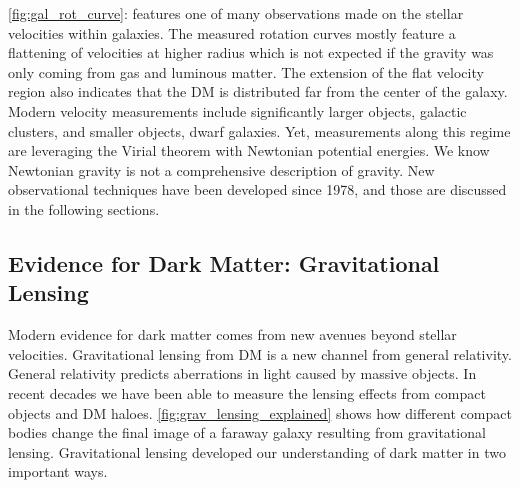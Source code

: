 \cref{fig:gal_rot_curve}: features one of many observations made on the stellar velocities within galaxies.
The measured rotation curves mostly feature a flattening of velocities at higher radius which is not expected if the gravity was only coming from gas and luminous matter.
The extension of the flat velocity region also indicates that the DM is distributed far from the center of the galaxy.
Modern velocity measurements include significantly larger objects, galactic clusters, and smaller objects, dwarf galaxies.
Yet, measurements along this regime are leveraging the Virial theorem with Newtonian potential energies.
We know Newtonian gravity is not a comprehensive description of gravity.
New observational techniques have been developed since 1978, and those are discussed in the following sections.

\subsection{Evidence for Dark Matter: Gravitational Lensing\label{sec:ev4dm_lens}}

Modern evidence for dark matter comes from new avenues beyond stellar velocities.
Gravitational lensing from DM is a new channel from general relativity.
General relativity predicts aberrations in light caused by massive objects.
In recent decades we have been able to measure the lensing effects from compact objects and DM haloes.
\cref{fig:grav_lensing_explained} shows how different compact bodies change the final image of a faraway galaxy resulting from gravitational lensing.
Gravitational lensing developed our understanding of dark matter in two important ways.

